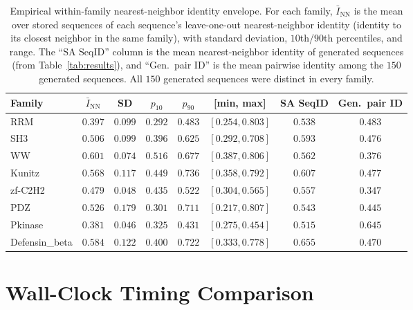 \documentclass[10pt]{article}
\begin{document}
\begin{table}[ht]
\centering
\caption{Empirical within-family nearest-neighbor identity envelope. For each family, $\bar{I}_{\mathrm{NN}}$ is the mean over stored sequences of each sequence's leave-one-out nearest-neighbor identity (identity to its closest neighbor in the same family), with standard deviation, $10$th/$90$th percentiles, and range. The ``SA SeqID'' column is the mean nearest-neighbor identity of generated sequences (from Table~\ref{tab:results}), and ``Gen.\ pair ID'' is the mean pairwise identity among the $150$ generated sequences. All $150$ generated sequences were distinct in every family.}
\label{tab:nn-band}
\small
\begin{tabular}{@{}lccccccc@{}}
\toprule
Family & $\bar{I}_{\mathrm{NN}}$ & SD & $p_{10}$ & $p_{90}$ & [min, max] & SA SeqID & Gen.\ pair ID \\
\midrule
RRM            & $0.397$ & $0.099$ & $0.292$ & $0.483$ & $[0.254, 0.803]$ & $0.538$ & $0.483$ \\
SH3            & $0.506$ & $0.099$ & $0.396$ & $0.625$ & $[0.292, 0.708]$ & $0.593$ & $0.476$ \\
WW             & $0.601$ & $0.074$ & $0.516$ & $0.677$ & $[0.387, 0.806]$ & $0.562$ & $0.376$ \\
Kunitz         & $0.568$ & $0.117$ & $0.449$ & $0.736$ & $[0.358, 0.792]$ & $0.607$ & $0.477$ \\
zf-C2H2        & $0.479$ & $0.048$ & $0.435$ & $0.522$ & $[0.304, 0.565]$ & $0.557$ & $0.347$ \\
PDZ            & $0.526$ & $0.179$ & $0.301$ & $0.711$ & $[0.217, 0.807]$ & $0.543$ & $0.445$ \\
Pkinase        & $0.381$ & $0.046$ & $0.325$ & $0.431$ & $[0.275, 0.454]$ & $0.515$ & $0.645$ \\
Defensin\_beta & $0.584$ & $0.122$ & $0.400$ & $0.722$ & $[0.333, 0.778]$ & $0.655$ & $0.470$ \\
\bottomrule
\end{tabular}
\end{table}

\section{Wall-Clock Timing Comparison}\label{si:timing}
\end{document}
